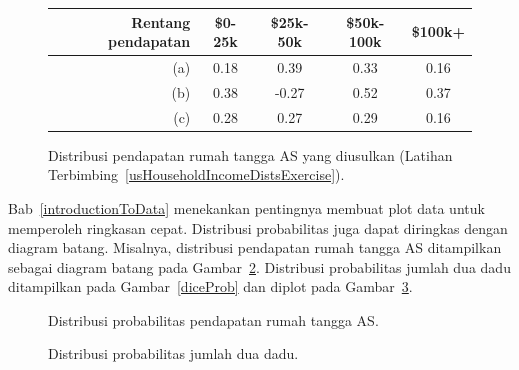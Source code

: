 \begin{figure}[h]
\centering
\begin{tabular}{r | cc cc}
  \hline
Rentang pendapatan & \$0-25k & \$25k-50k & \$50k-100k & \$100k+ \\
  \hline
(a)\hspace{0.2mm}	 & 0.18 & 0.39 & 0.33 & 0.16 \\
(b)				 & 0.38 & -0.27 & 0.52 & 0.37 \\
(c)\hspace{0.2mm}	 & 0.28 & 0.27 & 0.29 & 0.16 \\
  \hline
\end{tabular}
\caption{Distribusi pendapatan rumah tangga AS yang diusulkan (Latihan Terbimbing~\ref{usHouseholdIncomeDistsExercise}).}
\label{usHouseholdIncomeDists}
\end{figure}

Bab~\ref{introductionToData} menekankan pentingnya membuat plot data untuk memperoleh ringkasan cepat. Distribusi probabilitas juga dapat diringkas dengan diagram batang. Misalnya, distribusi pendapatan rumah tangga AS ditampilkan sebagai diagram batang pada Gambar~\ref{usHouseholdIncomeDistBar}. %
Distribusi probabilitas jumlah dua dadu ditampilkan pada Gambar~\ref{diceProb} dan diplot pada Gambar~\ref{diceSumDist}.

\begin{figure}[h]
  \centering
  \caption{Distribusi probabilitas pendapatan rumah tangga AS.}
  \label{usHouseholdIncomeDistBar}
\end{figure}

\begin{figure}
  \centering
  \caption{Distribusi probabilitas jumlah dua dadu.}
  \label{diceSumDist}
\end{figure}

